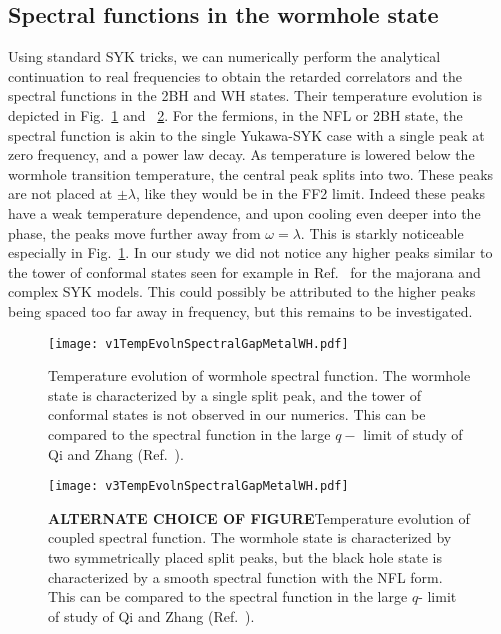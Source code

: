 \subsection{Spectral functions in the wormhole state}
Using standard SYK tricks, we can numerically perform the analytical continuation to real frequencies to obtain the retarded correlators and the spectral functions in the 2BH and WH states. 
Their temperature evolution is depicted in Fig.~\ref{fig:GreenFunctionPlotsMetalv1} and ~\ref{fig:GreenFunctionPlotsMetalv2}. 
%
For the fermions, in the NFL or 2BH state, the spectral function is akin to the single Yukawa-SYK case with a single peak at zero frequency, and a power law decay. As temperature is lowered below the wormhole transition temperature, the central peak splits into two. These peaks are not placed at $\pm \lambda$, like they would be in the FF2 limit. Indeed these peaks have a weak temperature dependence, and upon cooling even deeper into the phase, the peaks move further away from $\omega = \lambda$. This is starkly noticeable especially in Fig.~\ref{fig:GreenFunctionPlotsMetalv1}. 
%
In our study we did not notice any higher peaks similar to the tower of conformal states seen for example in Ref.~\cite{plugge2020revival,sahoo2020traversable,qi2020coupled} for the majorana and complex SYK models. This could possibly be attributed to the higher peaks being spaced too far away in frequency, but this remains to be investigated. 
%
\begin{figure}[h]
    \centering
    \texttt{[image: v1TempEvolnSpectralGapMetalWH.pdf]}
    \caption{Temperature evolution of wormhole spectral function. The wormhole state is characterized by a single split peak, and the tower of conformal states is not observed in our numerics. This can be compared to the spectral function in the large $q-$ limit of study of Qi and Zhang (Ref.~\cite{qi2020coupled}).}
    \label{fig:GreenFunctionPlotsMetalv1}
\end{figure}

\begin{figure}[h]
    \centering
    \texttt{[image: v3TempEvolnSpectralGapMetalWH.pdf]}
    \caption{\textbf{ALTERNATE CHOICE OF FIGURE}Temperature evolution of coupled spectral function. The wormhole state is characterized by two symmetrically placed split peaks, but the black hole state is characterized by a smooth spectral function with the NFL form. This can be compared to the spectral function in the large $q$- limit of study of Qi and Zhang (Ref.~\cite{qi2020coupled}).}
    \label{fig:GreenFunctionPlotsMetalv2}
\end{figure}



